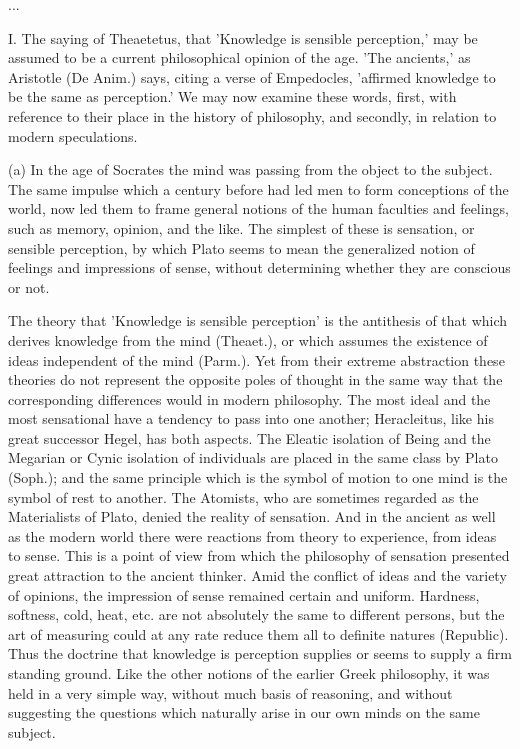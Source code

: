 ...

I. The saying of Theaetetus, that 'Knowledge is sensible perception,'
may be assumed to be a current philosophical opinion of the age. 'The
ancients,' as Aristotle (De Anim.) says, citing a verse of Empedocles,
'affirmed knowledge to be the same as perception.' We may now examine
these words, first, with reference to their place in the history of
philosophy, and secondly, in relation to modern speculations.

(a) In the age of Socrates the mind was passing from the object to the
subject. The same impulse which a century before had led men to form
conceptions of the world, now led them to frame general notions of the
human faculties and feelings, such as memory, opinion, and the like. The
simplest of these is sensation, or sensible perception, by which Plato
seems to mean the generalized notion of feelings and impressions of
sense, without determining whether they are conscious or not.

The theory that 'Knowledge is sensible perception' is the antithesis of
that which derives knowledge from the mind (Theaet.), or which assumes
the existence of ideas independent of the mind (Parm.). Yet from their
extreme abstraction these theories do not represent the opposite poles
of thought in the same way that the corresponding differences would
in modern philosophy. The most ideal and the most sensational have a
tendency to pass into one another; Heracleitus, like his great successor
Hegel, has both aspects. The Eleatic isolation of Being and the Megarian
or Cynic isolation of individuals are placed in the same class by Plato
(Soph.); and the same principle which is the symbol of motion to one
mind is the symbol of rest to another. The Atomists, who are sometimes
regarded as the Materialists of Plato, denied the reality of sensation.
And in the ancient as well as the modern world there were reactions from
theory to experience, from ideas to sense. This is a point of view from
which the philosophy of sensation presented great attraction to the
ancient thinker. Amid the conflict of ideas and the variety of opinions,
the impression of sense remained certain and uniform. Hardness,
softness, cold, heat, etc. are not absolutely the same to different
persons, but the art of measuring could at any rate reduce them all
to definite natures (Republic). Thus the doctrine that knowledge is
perception supplies or seems to supply a firm standing ground. Like the
other notions of the earlier Greek philosophy, it was held in a very
simple way, without much basis of reasoning, and without suggesting the
questions which naturally arise in our own minds on the same subject.

